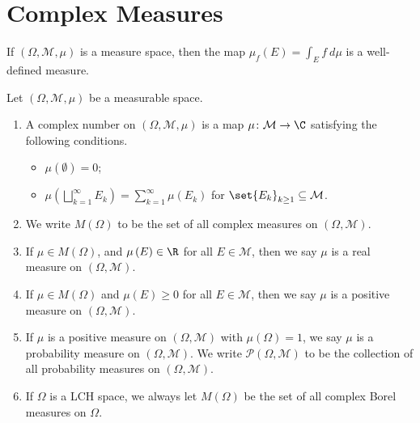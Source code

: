 \section{Complex Measures}%
\begin{example}
  If $\left(\Omega,\mathcal{M},\mu\right)$ is a measure space, then the map $\mu_f(E) = \int_{E}^{} f\:d\mu$ is a well-defined measure.
\end{example}
\begin{definition}
  Let $\left(\Omega,\mathcal{M},\mu\right)$ be a measurable space.
  \begin{enumerate}[(1)]
    \item A complex number on $\left(\Omega,\mathcal{M},\mu\right)$ is a map $\mu\colon \mathcal{M}\rightarrow \C$ satisfying the following conditions.
      \begin{itemize}
        \item $\mu\left(\emptyset\right) = 0$;
        \item $\displaystyle \mu\left(\bigsqcup_{k=1}^{\infty}E_k\right) = \sum_{k=1}^{\infty}\mu\left(E_k\right)$ for $\set{E_k}_{k\geq 1}\subseteq \mathcal{M}$.
      \end{itemize}
    \item We write $M\left(\Omega\right)$ to be the set of all complex measures on $\left(\Omega,\mathcal{M}\right)$.
    \item If $\mu\in M\left(\Omega\right)$, and $\mu\left(E\right)\in \R$ for all $E\in \mathcal{M}$, then we say $\mu$ is a real measure on $\left(\Omega,\mathcal{M}\right)$.
    \item If $\mu\in M\left(\Omega\right)$ and $\mu(E) \geq 0$ for all $E\in \mathcal{M}$, then we say $\mu$ is a positive measure on $\left(\Omega,\mathcal{M}\right)$.
    \item If $\mu$ is a positive measure on $\left(\Omega,\mathcal{M}\right)$ with $\mu\left(\Omega\right) = 1$, we say $\mu$ is a probability measure on $\left(\Omega,\mathcal{M}\right)$. We write $\mathcal{P}\left(\Omega,\mathcal{M}\right)$ to be the collection of all probability measures on $\left(\Omega,\mathcal{M}\right)$.
    \item If $\Omega$ is a LCH space, we always let $M\left(\Omega\right)$ be the set of all complex Borel measures on $\Omega$.
  \end{enumerate}
\end{definition}
